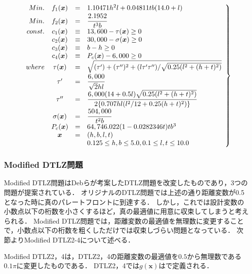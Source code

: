 \documentclass[../main/main]{subfiles}
\begin{document}
\begin{eqnarray}
\left.
\begin{array}{rccl}
Min. & f_1(\bm x) &=& 1.10471h^2l + 0.04811tb(14.0 + l) \\ 
Min. & f_2(\bm x) &=& \cfrac{2.1952}{t^3b}\\
const. &c_1(\bm x) &\equiv& 13,600 - \tau(\bm x) \geq 0\\
          & c_2(\bm x) &\equiv& 30,000 - \sigma(\bm x) \geq 0 \\
          & c_3(\bm x) &\equiv& b-h \geq 0 \\
          & c_4(\bm x) &\equiv& P_c(\bm x) - 6,000 \geq 0\\

where &\tau(\bm x) & = & \sqrt{(\tau^\prime) + (\tau^{\prime \prime})^2 + (l \tau^\prime \tau^{\prime \prime}) / \sqrt{0.25(l^2 + (h+t)^2)}}\\
           &\tau^\prime & = & \cfrac{6,000}{\sqrt{2}hl}\\
           &\tau^{\prime \prime} &=& \cfrac{6,000(14 + 0.5l)\sqrt{0.25(l^2 + (h+t)^2)}}{2\{0.707hl(l^2/12+0.25(h+t)^2)\}}\\
           &\sigma(\bm x) &=& \cfrac{504,000}{t^2b}\\
           &P_c(\bm x) &=& 64,746.022(1-0.0282346t)tb^3\\
           & \bm x &=& (h, b, l, t)\\
           & & & 0.125 \leq h,b \leq 5.0, 0.1 \leq l,t \leq 10.0\\
\end{array}
\right\}
\label{wbd_eq}
\end{eqnarray}

\newpage

\subsubsection{Modified DTLZ問題}
Modified DTLZ問題はDebらが考案したDTLZ問題を改変したものであり，3つの問題が提案されている．
オリジナルのDTLZ問題では上述の通り距離変数が0.5となった時に真のパレートフロントに到達する．
しかし，これでは設計変数の小数点以下の桁数を小さくするほど，真の最適値に用意に収束してしまうと考えられる．
Modified DTLZ問題では，距離変数の最適値を無理数に変更することで，小数点以下の桁数を粗くしただけでは収束しづらい問題となっている．
次節よりModified DTLZ2-4について述べる．

Modified DTLZ2，4は，DTLZ2，4の距離変数の最適値を$0.5$から無理数である$0.1\pi$に変更したものである．
DTLZ2，4では$g(\bm x)$はで定義される．
\end{document}
